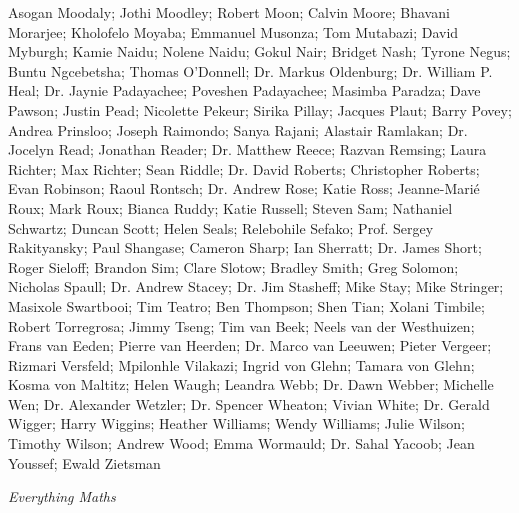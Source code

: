 Asogan Moodaly; Jothi Moodley; Robert Moon; Calvin Moore; Bhavani Morarjee; Kholofelo Moyaba; Emmanuel
Musonza; Tom Mutabazi; David Myburgh; Kamie Naidu; Nolene Naidu; Gokul Nair; Bridget Nash; Tyrone Negus;
Buntu Ngcebetsha; Thomas O’Donnell; Dr. Markus Oldenburg; Dr. William P. Heal; Dr. Jaynie Padayachee; Poveshen
Padayachee; Masimba Paradza; Dave Pawson; Justin Pead; Nicolette Pekeur; Sirika Pillay; Jacques Plaut; Barry
Povey; Andrea Prinsloo; Joseph Raimondo; Sanya Rajani; Alastair Ramlakan; Dr. Jocelyn Read; Jonathan Reader; Dr.
Matthew Reece; Razvan Remsing; Laura Richter; Max Richter; Sean Riddle; Dr. David Roberts; Christopher Roberts;
Evan Robinson; Raoul Rontsch; Dr. Andrew Rose; Katie Ross; Jeanne-Marié Roux; Mark Roux; Bianca Ruddy; Katie
Russell; Steven Sam; Nathaniel Schwartz; Duncan Scott; Helen Seals; Relebohile Sefako; Prof. Sergey Rakityansky;
Paul Shangase; Cameron Sharp; Ian Sherratt; Dr. James Short; Roger Sieloff; Brandon Sim; Clare Slotow; Bradley
Smith; Greg Solomon; Nicholas Spaull; Dr. Andrew Stacey; Dr. Jim Stasheff; Mike Stay; Mike Stringer; Masixole
Swartbooi; Tim Teatro; Ben Thompson; Shen Tian; Xolani Timbile; Robert Torregrosa; Jimmy Tseng; Tim van Beek;
Neels van der Westhuizen; Frans van Eeden; Pierre van Heerden; Dr. Marco van Leeuwen; Pieter Vergeer; Rizmari
Versfeld; Mpilonhle Vilakazi; Ingrid von Glehn; Tamara von Glehn; Kosma von Maltitz; Helen Waugh; Leandra Webb;
Dr. Dawn Webber; Michelle Wen; Dr. Alexander Wetzler; Dr. Spencer Wheaton; Vivian White; Dr. Gerald Wigger;
Harry Wiggins; Heather Williams; Wendy Williams; Julie Wilson; Timothy Wilson; Andrew Wood; Emma Wormauld;
Dr. Sahal Yacoob; Jean Youssef; Ewald Zietsman








\newpage
\thispagestyle{empty}

{\normalfont\sffamily\fontsize{22}\normalfont\itshape Everything Maths} \par


